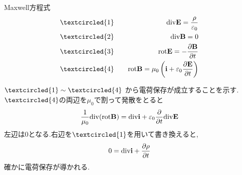 \documentclass{jsarticle}
\begin{document}
\begin{itembox}[c]{Maxwell方程式}
\begin{eqnarray*}
&\textcircled{\scriptsize 1}& \quad {\rm div}{\bf E}=\frac{\rho}{\varepsilon_0} \\
&\textcircled{\scriptsize 2}& \quad {\rm div}{\bf B}=0 \\
&\textcircled{\scriptsize 3}& \quad {\rm rot}{\bf E}=-\frac{\partial {\bf B}}{\partial t} \\
&\textcircled{\scriptsize 4}& \quad {\rm rot}{\bf B}=\mu_0 \left( {\bf i} + \varepsilon_0 \frac{\partial {\bf E}}{\partial t} \right)
\end{eqnarray*}
\end{itembox}
$\textcircled{\scriptsize 1} \sim \textcircled{\scriptsize 4}$ から電荷保存が成立することを示す. \\
$\textcircled{\scriptsize 4}$の両辺を$\mu_0$で割って発散をとると
\begin{eqnarray*}
\frac{1}{\mu_0} {\rm div}({\rm rot}{\bf B}) = {\rm div}{\bf i} + \varepsilon_0 \frac{\partial}{\partial t} {\rm div}{\bf E}
\end{eqnarray*}
左辺は0となる.右辺を$\textcircled{\scriptsize 1}$を用いて書き換えると,
\begin{eqnarray*}
0 = {\rm div}{\bf i} + \frac{\partial \rho}{\partial t}
\end{eqnarray*}
確かに電荷保存が導かれる. \\
\end{document}
